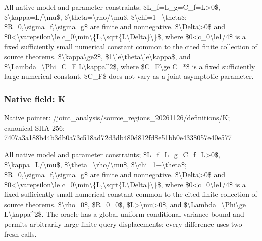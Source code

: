\documentclass[10pt,a4paper]{article}
\begin{document}
All native model and parameter constraints; \$L\_f=L\_g=C\_f=L>0\$, \$\textbackslash{}kappa=L/\textbackslash{}mu\$, \$\textbackslash{}theta=\textbackslash{}rho/\textbackslash{}mu\$, \$\textbackslash{}chi=1+\textbackslash{}theta\$; \$R\_0,\textbackslash{}sigma\_f,\textbackslash{}sigma\_g\$ are finite and nonnegative. \$\textbackslash{}Delta>0\$ and \$0<\textbackslash{}varepsilon\textbackslash{}le c\_0\textbackslash{}min\textbackslash{}\{L,\textbackslash{}sqrt\{L\textbackslash{}Delta\}\textbackslash{}\}\$, where \$0<c\_0\textbackslash{}le1/4\$ is a fixed sufficiently small numerical constant common to the cited finite collection of source theorems. \$\textbackslash{}kappa\textbackslash{}ge2\$, \$1\textbackslash{}le\textbackslash{}theta\textbackslash{}le\textbackslash{}kappa\$, and \$\textbackslash{}Lambda\_\textbackslash{}Phi=C\_F L\textbackslash{}kappa\textasciicircum{}2\$, where \$C\_F\textbackslash{}ge C\_*\$ is a fixed sufficiently large numerical constant. \$C\_F\$ does not vary as a joint asymptotic parameter.


\subsubsection{Native field: K}


Native pointer: /joint\_analysis/source\_r\allowbreak{}egions\_20261126/definiti\allowbreak{}ons/K; canonical SHA-256: 7407a3a188b44b3db0a73c51\allowbreak{}8ad72d3db480d812fd8e51bb\allowbreak{}0e4338057e40e577


All native model and parameter constraints; \$L\_f=L\_g=C\_f=L>0\$, \$\textbackslash{}kappa=L/\textbackslash{}mu\$, \$\textbackslash{}theta=\textbackslash{}rho/\textbackslash{}mu\$, \$\textbackslash{}chi=1+\textbackslash{}theta\$; \$R\_0,\textbackslash{}sigma\_f,\textbackslash{}sigma\_g\$ are finite and nonnegative. \$\textbackslash{}Delta>0\$ and \$0<\textbackslash{}varepsilon\textbackslash{}le c\_0\textbackslash{}min\textbackslash{}\{L,\textbackslash{}sqrt\{L\textbackslash{}Delta\}\textbackslash{}\}\$, where \$0<c\_0\textbackslash{}le1/4\$ is a fixed sufficiently small numerical constant common to the cited finite collection of source theorems. \$\textbackslash{}rho=0\$, \$R\_0=0\$, \$L>\textbackslash{}mu>0\$, and \$\textbackslash{}Lambda\_\textbackslash{}Phi\textbackslash{}ge L\textbackslash{}kappa\textasciicircum{}2\$. The oracle has a global uniform conditional variance bound and permits arbitrarily large finite query displacements; every difference uses two fresh calls.
\end{document}

